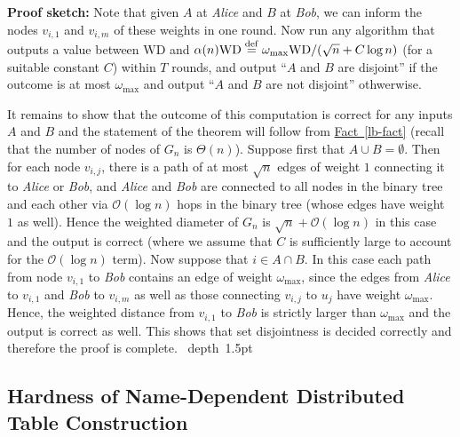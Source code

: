 \documentclass[letterpaper,11pt]{article}
\newcommand{\namedref}[2]{\hyperref[#2]{#1~\ref*{#2}}}
\newcommand{\factref}[1]{\namedref{Fact}{#1}}
\newcommand{\blackslug}{\hbox{\hskip 1pt \vrule width 4pt height 8pt
depth 1.5pt \hskip 1pt}}
\newcommand{\QED}{\quad\blackslug\lower 8.5pt\null\par}
\newenvironment{proof}[1][Proof:]{\noindent \textbf{#1}\xspace}{\QED}
\newcommand{\BO}{\mathcal{O}}
\newcommand{\DEF}{\ensuremath{\stackrel{\rm def}{=}}}
\newcommand{\WD}{\mathrm{WD}}
\begin{document}
\begin{proof}[Proof sketch:]
Note that given $A$ at \emph{Alice} and $B$ at \emph{Bob}, we can inform the nodes $v_{i,1}$
and $v_{i,m}$ of these weights in one round. Now run any algorithm that outputs
a value between $\WD$ and $\alpha(n)\WD\DEF \omega_{\max}\WD/(\sqrt{n}+C\log n)$
(for a suitable constant $C$) within $T$ rounds, and output ``$A$ and $B$ are
disjoint'' if the outcome is at most $\omega_{\max}$ and output ``$A$ and $B$
are not disjoint'' othwerwise.

It remains to show that the outcome of this computation is correct for any
inputs $A$ and $B$ and the statement of the theorem will follow from
\factref{lb-fact} (recall that the number of nodes of $G_n$ is $\Theta(n)$).
Suppose first that $A\cup B=\emptyset$. Then for each node $v_{i,j}$, there is a
path of at most $\sqrt{n}$ edges of weight $1$ connecting it to \emph{Alice} or
\emph{Bob}, and \emph{Alice} and \emph{Bob} are connected to all nodes in the
binary tree and each other via $\BO(\log n)$ hops in the binary tree (whose
edges have weight $1$ as well). Hence the weighted diameter of $G_n$ is
$\sqrt{n}+\BO(\log n)$ in this case and the output is correct (where we assume
that $C$ is sufficiently large to account for the $\BO(\log n)$ term). Now
suppose that $i\in A\cap B$. In this case each path from node $v_{i,1}$ to
\emph{Bob} contains an edge of weight $\omega_{\max}$, since the edges from
\emph{Alice} to $v_{i,1}$ and \emph{Bob} to $v_{i,m}$ as well as those
connecting $v_{i,j}$ to $u_j$ have weight $\omega_{\max}$. Hence, the weighted
distance from $v_{i,1}$ to \emph{Bob} is strictly larger than $\omega_{\max}$
and the output is correct as well. This shows that set disjointness is decided
correctly and therefore the proof is complete.
\end{proof}


\subsection{Hardness of Name-Dependent Distributed Table Construction}
\label{sec:lb}
\end{document}
